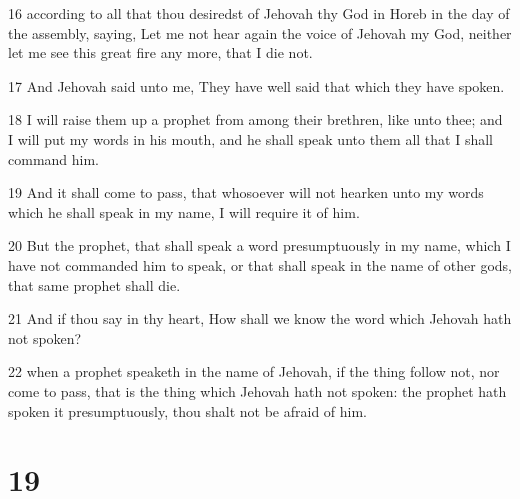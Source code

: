 \par 16 according to all that thou desiredst of Jehovah thy God in Horeb in the day of the assembly, saying, Let me not hear again the voice of Jehovah my God, neither let me see this great fire any more, that I die not.
\par 17 And Jehovah said unto me, They have well said that which they have spoken.
\par 18 I will raise them up a prophet from among their brethren, like unto thee; and I will put my words in his mouth, and he shall speak unto them all that I shall command him.
\par 19 And it shall come to pass, that whosoever will not hearken unto my words which he shall speak in my name, I will require it of him.
\par 20 But the prophet, that shall speak a word presumptuously in my name, which I have not commanded him to speak, or that shall speak in the name of other gods, that same prophet shall die.
\par 21 And if thou say in thy heart, How shall we know the word which Jehovah hath not spoken?
\par 22 when a prophet speaketh in the name of Jehovah, if the thing follow not, nor come to pass, that is the thing which Jehovah hath not spoken: the prophet hath spoken it presumptuously, thou shalt not be afraid of him.

\chapter{19}

